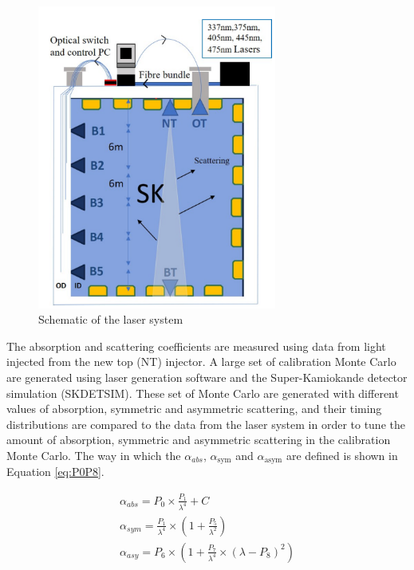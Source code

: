 \begin{figure}
    \centering
    \includegraphics[width=0.7\textwidth]{Figures/laser_system.png}
    \caption{Schematic of the laser system}
    \label{fig:laser_system}
\end{figure}

The absorption and scattering coefficients are measured using data from light injected from the new top (NT) injector. A large set of calibration Monte Carlo are generated using laser generation software and the Super-Kamiokande detector simulation (SKDETSIM). These set of Monte Carlo are generated with different values of absorption, symmetric and asymmetric scattering, and their timing distributions are compared to the data from the laser system in order to tune the amount of absorption, symmetric and asymmetric scattering in the calibration Monte Carlo. The way in which the $\alpha_{abs}$, $\alpha_{\text {sym}}$ and $\alpha_{\text {asym}}$ are defined is shown in Equation \ref{eq:P0P8}.

\begin{equation}
\begin{gathered}
\alpha_{a b s}=P_{0} \times \frac{P_{1}}{\lambda^{4}}+C \label{eq:P0P8}\\ 
\alpha_{s y m}=\frac{P_{1}}{\lambda^{4}} \times\left(1+\frac{P_{5}}{\lambda^{2}}\right) \\
\alpha_{a s y}=P_{6} \times\left(1+\frac{P_{7}}{\lambda^{4}} \times\left(\lambda-P_{8}\right)^{2}\right)
\end{gathered}
\end{equation}

